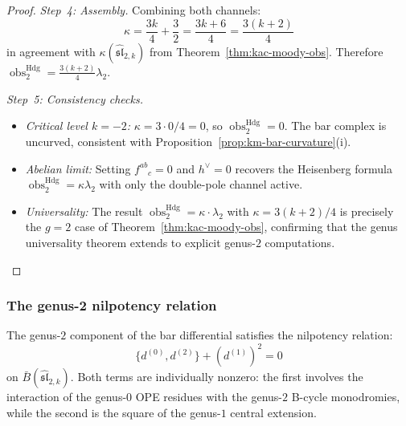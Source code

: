 \begin{proof}
\emph{Step~4: Assembly.}
Combining both channels:
\begin{equation}
\kappa = \frac{3k}{4} + \frac{3}{2}
= \frac{3k + 6}{4} = \frac{3(k+2)}{4}
\end{equation}
in agreement with $\kappa(\widehat{\mathfrak{sl}}_{2,k})$ from
Theorem~\ref{thm:kac-moody-obs}.
Therefore
$\operatorname{obs}^{\mathrm{Hdg}}_2
=\frac{3(k+2)}4\lambda_2$.

\emph{Step~5: Consistency checks.}
\begin{itemize}
\item \emph{Critical level $k = -2$:}
$\kappa = 3 \cdot 0/4 = 0$, so
$\operatorname{obs}^{\mathrm{Hdg}}_2=0$.
The bar complex is uncurved, consistent with
Proposition~\ref{prop:km-bar-curvature}(i).
\item \emph{Abelian limit:}
Setting $f^{ab}{}_c = 0$ and $h^\vee = 0$ recovers the
Heisenberg formula
$\operatorname{obs}^{\mathrm{Hdg}}_2=\kappa\lambda_2$
with only the double-pole channel active.
\item \emph{Universality:} The result
$\operatorname{obs}^{\mathrm{Hdg}}_2 =
\kappa \cdot \lambda_2$ with $\kappa = 3(k+2)/4$ is
precisely the $g = 2$ case of
Theorem~\ref{thm:kac-moody-obs}, confirming that the
genus universality theorem extends to explicit genus-$2$
computations.
\end{itemize}
\end{proof}

\subsubsection{The genus-2 nilpotency relation}

\begin{proposition}\label{prop:sl2-genus2-relation}
The genus-$2$ component of the bar differential satisfies the
nilpotency relation:
\begin{equation}\label{eq:sl2-genus2-nil}
\{d^{(0)}, d^{(2)}\} + (d^{(1)})^2 = 0
\end{equation}
on $\bar{B}(\widehat{\mathfrak{sl}}_{2,k})$. Both terms are
individually nonzero: the first involves the interaction of the
genus-$0$ OPE residues with the genus-$2$ B-cycle monodromies, while
the second is the square of the genus-$1$ central extension.
\end{proposition}

